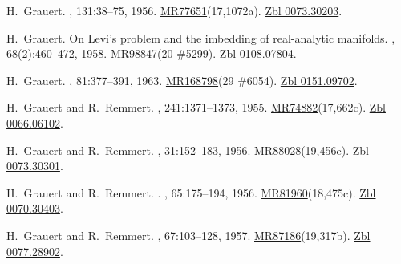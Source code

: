 \documentclass[11pt,a4paper, final, twoside]{article}
\numberwithin{equation}{section}
\begin{document}
\begin{appendices}
\begin{thebibliography}{100}
H.~Grauert.
, 131:38--75, 1956.
\newblock
  \href{http://www.ams.org/mathscinet-getitem?mr=77651}{MR77651}(17,1072a).
  \href{http://zbmath.org/?q=an:0073.30203}{Zbl 0073.30203}.

H.~Grauert.
\newblock On {L}evi's problem and the imbedding of real-analytic manifolds.
, 68(2):460--472, 1958.
\newblock \href{http://www.ams.org/mathscinet-getitem?mr=98847}{MR98847}(20
  \#5299). \href{http://zbmath.org/?q=an:0108.07804}{Zbl 0108.07804}.

H.~Grauert.
, 81:377--391, 1963.
\newblock \href{http://www.ams.org/mathscinet-getitem?mr=168798}{MR168798}(29
  \#6054). \href{http://zbmath.org/?q=an:0151.09702}{Zbl 0151.09702}.

H.~Grauert and R.~Remmert.
, 241:1371--1373, 1955.
\newblock
  \href{http://www.ams.org/mathscinet-getitem?mr=74882}{MR74882}(17,662c).
  \href{http://zbmath.org/?q=an:0066.06102}{Zbl 0066.06102}.

H.~Grauert and R.~Remmert.
, 31:152--183, 1956.
\newblock
  \href{http://www.ams.org/mathscinet-getitem?mr=88028}{MR88028}(19,456e).
  \href{http://zbmath.org/?q=an:0073.30301}{Zbl 0073.30301}.

H.~Grauert and R.~Remmert.
.
, 65:175--194, 1956.
\newblock
  \href{http://www.ams.org/mathscinet-getitem?mr=81960}{MR81960}(18,475c).
  \href{http://zbmath.org/?q=an:0070.30403}{Zbl 0070.30403}.

H.~Grauert and R.~Remmert.
, 67:103--128, 1957.
\newblock
  \href{http://www.ams.org/mathscinet-getitem?mr=87186}{MR87186}(19,317b).
  \href{http://zbmath.org/?q=an:0077.28902}{Zbl 0077.28902}.


\end{thebibliography}
\end{appendices}
\end{document}
